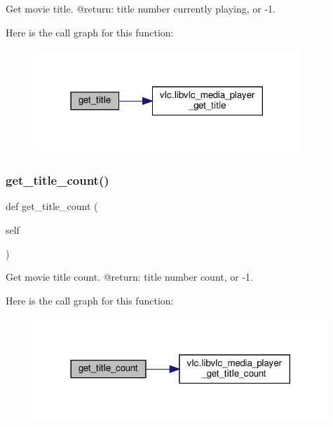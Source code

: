 \begin{DoxyVerb}Get movie title.
@return: title number currently playing, or -1.
\end{DoxyVerb}
 Here is the call graph for this function\+:
\nopagebreak
\begin{figure}[H]
\begin{center}
\leavevmode
\includegraphics[width=285pt]{classvlc_1_1_media_player_a49f200bc32e91377ec9f649ddda7bb5b_cgraph}
\end{center}
\end{figure}
\mbox{\label{classvlc_1_1_media_player_a46b1e4f7e089120a2f0b7ef16cb1306b}} 
\subsubsection{\texorpdfstring{get\+\_\+title\+\_\+count()}{get\_title\_count()}}
{\footnotesize\ttfamily def get\+\_\+title\+\_\+count (\begin{DoxyParamCaption}\item[{}]{self }\end{DoxyParamCaption})}

\begin{DoxyVerb}Get movie title count.
@return: title number count, or -1.
\end{DoxyVerb}
 Here is the call graph for this function\+:
\nopagebreak
\begin{figure}[H]
\begin{center}
\leavevmode
\includegraphics[width=314pt]{classvlc_1_1_media_player_a46b1e4f7e089120a2f0b7ef16cb1306b_cgraph}
\end{center}
\end{figure}
\mbox{\label{classvlc_1_1_media_player_a8ec246f66e5d2c300931d6748fa72cbf}} 
